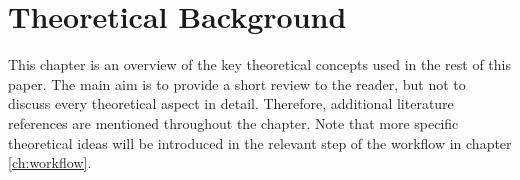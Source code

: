 \chapter{Theoretical Background}
This chapter is an overview of the key theoretical concepts used in the rest of this paper.
The main aim is to provide a short review to the reader, but not to discuss every theoretical aspect in detail.
Therefore, additional literature references are mentioned throughout the chapter.
Note that more specific theoretical ideas will be introduced in the relevant step of the workflow in chapter \ref{ch:workflow}.





